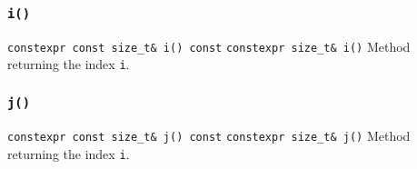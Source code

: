 \subsubsection{\texttt{i()}}
\texttt{constexpr const size\_t\& i() const}\newline
\texttt{constexpr size\_t\& i()}\newline
Method returning the index \texttt{i}.

\subsubsection{\texttt{j()}}
\texttt{constexpr const size\_t\& j() const}\newline
\texttt{constexpr size\_t\& j()}\newline
Method returning the index \texttt{i}.